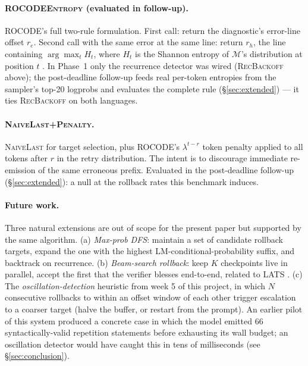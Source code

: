 \paragraph{\textsc{ROCODEEntropy} (evaluated in follow-up).}
ROCODE's full two-rule formulation. First call: return the
diagnostic's error-line offset
$r_e$. Second call with the same error at the same line: return
$r_h$, the line containing $\arg\max_t H_t$, where $H_t$ is the
Shannon entropy of $\mathcal{M}$'s distribution at position $t$
\citep[Eq.~5]{jiang2024rocode}. In Phase~1 only the recurrence
detector was wired (\textsc{RecBackoff} above); the post-deadline
follow-up feeds real per-token entropies from the sampler's
top-20 logprobs and evaluates the complete rule
(\S\ref{sec:extended}) --- it ties \textsc{RecBackoff} on both
languages.

\paragraph{\textsc{NaiveLast+Penalty}.} \textsc{NaiveLast} for
target selection, plus ROCODE's $\lambda^{t-r}$ token penalty
\citep[Eq.~8--9]{jiang2024rocode} applied to all tokens after $r$ in
the retry distribution. The intent is to discourage immediate
re-emission of the same erroneous prefix. Evaluated in the
post-deadline follow-up (\S\ref{sec:extended}): a null at the
rollback rates this benchmark induces.

\paragraph{Future work.} Three natural extensions are out of
scope for the present paper but supported by the same algorithm.
(a) \emph{Max-prob DFS}: maintain a set of candidate rollback
targets, expand the one with the highest LM-conditional-probability
suffix, and backtrack on recurrence. (b) \emph{Beam-search rollback}:
keep $K$ checkpoints live in parallel, accept the first that the
verifier blesses end-to-end, related to LATS
\citep{zhou2024lats}. (c) The \emph{oscillation-detection} heuristic
from week 5 of this project, in which $N$ consecutive rollbacks to
within an offset window of each other trigger escalation to a
coarser target (halve the buffer, or restart from the prompt). An
earlier pilot of this system produced a concrete case in which the
model emitted
66 syntactically-valid repetition statements before exhausting its
wall budget; an oscillation detector would have caught this in tens
of milliseconds (see \S\ref{sec:conclusion}).

